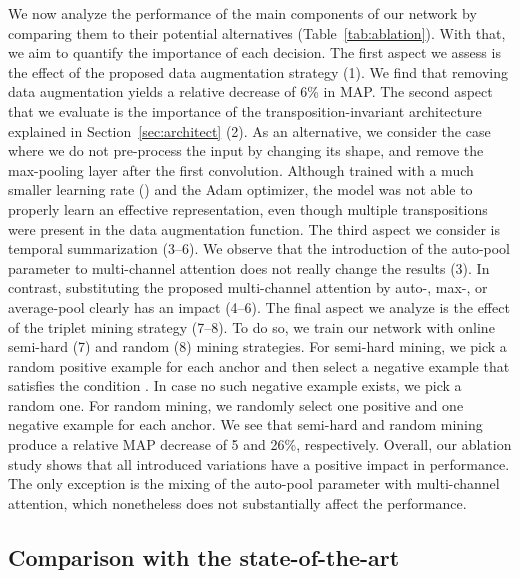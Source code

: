 \documentclass[letterpaper]{article}
\begin{document}
We now analyze the performance of the main components of our network by comparing them to their potential alternatives (Table~\ref{tab:ablation}). With that, we aim to quantify the importance of each decision. The first aspect we assess is the effect of the proposed data augmentation strategy (1). We find that removing data augmentation yields a relative decrease of 6\% in MAP. The second aspect that we evaluate is the importance of the transposition-invariant architecture explained in Section~\ref{sec:architect} (2). As an alternative, we consider the case where we do not pre-process the input by changing its shape, and remove the max-pooling layer after the first convolution. Although trained with a much smaller learning rate () and the Adam optimizer, the model was not able to properly learn an effective representation, even though multiple transpositions were present in the data augmentation function. The third aspect we consider is temporal summarization (3--6). We observe that the introduction of the auto-pool parameter  to multi-channel attention does not really change the results (3). In contrast, substituting the proposed multi-channel attention by auto-, max-, or average-pool clearly has an impact (4--6). The final aspect we analyze is the effect of the triplet mining strategy (7--8). To do so, we train our network with online semi-hard (7) and random (8) mining strategies. For semi-hard mining, we pick a random positive example for each anchor and then select a negative example that satisfies the condition . In case no such negative example exists, we pick a random one. For random mining, we randomly select one positive and one negative example for each anchor. We see that semi-hard and random mining produce a relative MAP decrease of 5 and 26\%, respectively. Overall, our ablation study shows that all introduced variations have a positive impact in performance. The only exception is the mixing of the auto-pool parameter with multi-channel attention, which nonetheless does not substantially affect the performance.

\subsection{Comparison with the state-of-the-art}
\end{document}
